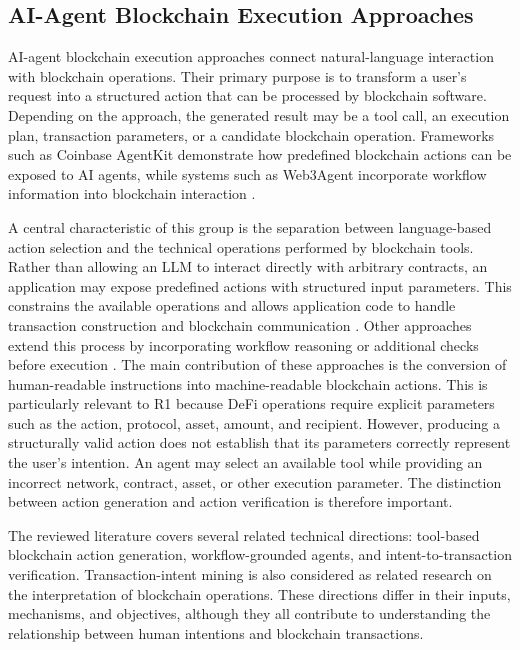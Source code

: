 

\subsection{AI-Agent Blockchain Execution Approaches}
\label{subsec:ai_agent_blockchain_execution}

AI-agent blockchain execution approaches connect natural-language
interaction with blockchain operations. Their primary purpose is
to transform a user's request into a structured action that can
be processed by blockchain software. Depending on the approach,
the generated result may be a tool call, an execution plan,
transaction parameters, or a candidate blockchain operation.
Frameworks such as Coinbase AgentKit demonstrate how predefined
blockchain actions can be exposed to AI agents, while systems
such as Web3Agent incorporate workflow information into
blockchain interaction
\cite{coinbaseAgentKit2026,TODO_Web3Agent}.

A central characteristic of this group is the separation
between language-based action selection and the technical
operations performed by blockchain tools. Rather than allowing
an LLM to interact directly with arbitrary contracts, an
application may expose predefined actions with structured
input parameters. This constrains the available operations
and allows application code to handle transaction construction
and blockchain communication
\cite{coinbaseAgentKit2026}. Other approaches extend this
process by incorporating workflow reasoning or additional
checks before execution
\cite{TODO_Web3Agent,TODO_Arbiter2026}. The main contribution of these approaches is the conversion
of human-readable instructions into machine-readable blockchain
actions. This is particularly relevant to R1 because DeFi
operations require explicit parameters such as the action,
protocol, asset, amount, and recipient. However, producing
a structurally valid action does not establish that its
parameters correctly represent the user's intention.
An agent may select an available tool while providing an
incorrect network, contract, asset, or other execution
parameter. The distinction between action generation and
action verification is therefore important.

The reviewed literature covers several related technical
directions: tool-based blockchain action generation,
workflow-grounded agents, and intent-to-transaction
verification. Transaction-intent mining is also considered
as related research on the interpretation of blockchain
operations. These directions differ in their inputs,
mechanisms, and objectives, although they all contribute
to understanding the relationship between human intentions
and blockchain transactions.

